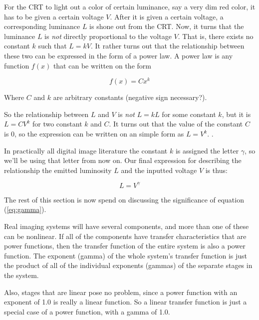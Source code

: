 For the CRT to light out a color of certain luminance, say a very dim
red color, it has to be given a certain voltage $V$. After it is given
a certain voltage, a corresponding luminance $L$ is shone out from the
CRT. Now, it turns that the luminance $L$ is \textit{not} directly
proportional to the voltage $V$. That is, there exists no constant $k$
such that $L = kV$. It rather turns out that the relationship between
these two can be expressed in the form of a power law. A power law is
any function $f(x)$ that can be written on the form

\begin{equation*}
  f(x) = Cx^k
\end{equation*}

Where $C$ and $k$ are arbitrary constants (negative sign necessary?)\cite{newman05power,easley2010networks_powerlaw}.

So the relationship between $L$ and $V$ is \textit{not} $L = kL$ for
some constant $k$, but it is $L = CV^k$ for two constant $k$ and
$C$. It turns out that the value of the constant $C$ is $0$, so the
expression can be written on an simple form as $L =
V^k$. \cite{motta1991analytical_crt,Pascale2003_ReviewRGBColourSpaces,boutel:_png_portab_networ_graph_specif_version1,boutel:_png_portab_networ_graph_specif_version11,boutel:_png_portab_networ_graph_specif_version12,roelofs99:_png}.

In practically all digital image literature the constant $k$ is
assigned the letter $\gamma$, so we'll be using that letter from now
on. Our final expression for describing the relationship the emitted
luminosity $L$ and the inputted voltage $V$ is thus:

\begin{equation}
  \label{eq:gamma}
  L = V^\gamma
\end{equation}

The rest of this section is now spend on discussing the significance
of equation (\ref{eq:gamma}).

Real imaging systems will have several components, and more than one
of these can be nonlinear. If all of the components have transfer
characteristics that are power functions, then the transfer function
of the entire system is also a power function. The exponent (gamma) of
the whole system's transfer function is just the product of all of the
individual exponents (gammas) of the separate stages in the system.

Also, stages that are linear pose no problem, since a power function
with an exponent of 1.0 is really a linear function. So a linear
transfer function is just a special case of a power function, with a
gamma of 1.0.

